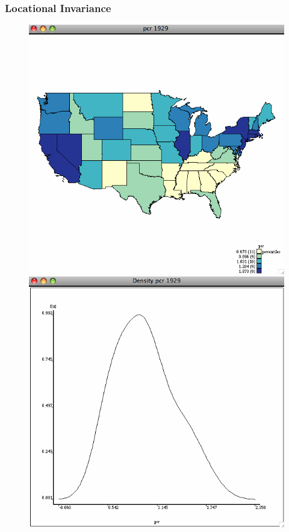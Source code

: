 \documentclass[nototal,handout]{beamer}
\begin{document}
\begin{frame}
	\frametitle{Locational Invariance}
 \begin{figure}[ht]
  \begin{minipage}[b]{0.4\linewidth}
  \centering
  \includegraphics[scale=0.20]{income29.png}
  \end{minipage}
  \begin{minipage}[b]{0.4\linewidth}
  \centering
  \includegraphics[scale=0.20]{density29.png}

\end{minipage}
\end{figure}
\end{frame}
\end{document}
